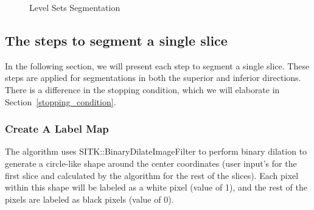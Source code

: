 \begin{figure}[H] 
\centering
{}%
%
%
\caption[Level Sets Segmentation]{Level Sets Segmentation}
\label{LSS}
\end{figure}

\subsection{The steps to segment a single slice}
In the following section, we will present each step to segment a single slice. These steps are applied for segmentations in both the superior and inferior directions. There is a difference in the stopping condition, which we will elaborate in Section~\ref{stopping_condition}.

\subsubsection{Create A Label Map}\label{label_map}
The algorithm uses SITK::BinaryDilateImageFilter to perform binary dilation to generate a circle-like shape around the center coordinates (user input’s for the first slice and calculated by the algorithm for the rest of the slices). Each pixel within this shape will be labeled as a white pixel (value of 1), and the rest of the pixels are labeled as black pixels (value of 0). 

